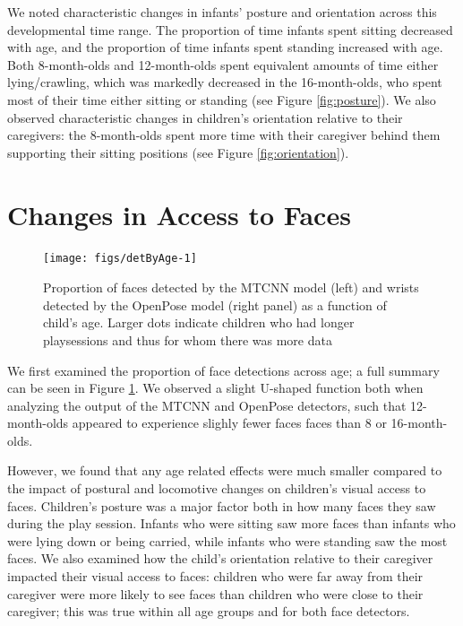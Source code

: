 \documentclass[10pt, letterpaper]{article}
\newenvironment{CodeChunk}{}{}
\begin{document}
We noted characteristic changes in infants' posture and orientation
across this developmental time range. The proportion of time infants
spent sitting decreased with age, and the proportion of time infants
spent standing increased with age. Both 8-month-olds and 12-month-olds
spent equivalent amounts of time either lying/crawling, which was
markedly decreased in the 16-month-olds, who spent most of their time
either sitting or standing (see Figure \ref{fig:posture}). We also
observed characteristic changes in children's orientation relative to
their caregivers: the 8-month-olds spent more time with their caregiver
behind them supporting their sitting positions (see Figure
\ref{fig:orientation}).

\section{Changes in Access to Faces}\label{changes-in-access-to-faces}

\begin{CodeChunk}
\begin{figure}[h]

{\centering \texttt{[image: figs/detByAge-1]} 

}

\caption[Proportion of faces detected by the MTCNN model (left) and wrists detected by the OpenPose model (right panel) as a function of child's age]{Proportion of faces detected by the MTCNN model (left) and wrists detected by the OpenPose model (right panel) as a function of child's age. Larger dots indicate children who had longer playsessions and thus for whom there was more data}\label{fig:detByAge}
\end{figure}
\end{CodeChunk}

We first examined the proportion of face detections across age; a full
summary can be seen in Figure \ref{fig:detByAge}. We observed a slight
U-shaped function both when analyzing the output of the MTCNN and
OpenPose detectors, such that 12-month-olds appeared to experience
slighly fewer faces faces than 8 or 16-month-olds.

However, we found that any age related effects were much smaller
compared to the impact of postural and locomotive changes on children's
visual access to faces. Children's posture was a major factor both in
how many faces they saw during the play session. Infants who were
sitting saw more faces than infants who were lying down or being
carried, while infants who were standing saw the most faces. We also
examined how the child's orientation relative to their caregiver
impacted their visual access to faces: children who were far away from
their caregiver were more likely to see faces than children who were
close to their caregiver; this was true within all age groups and for
both face detectors.
\end{document}
